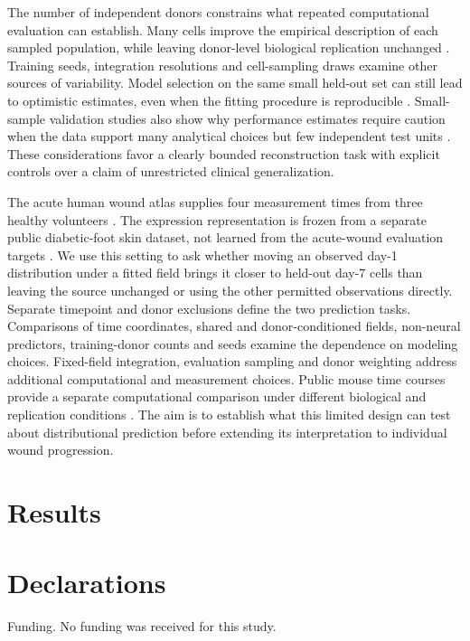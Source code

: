 \documentclass[10pt,a4paper]{article}
\begin{document}
The number of independent donors constrains what repeated computational evaluation can establish. Many cells improve the empirical description of each sampled population, while leaving donor-level biological replication unchanged \citep{zimmerman2021}. Training seeds, integration resolutions and cell-sampling draws examine other sources of variability. Model selection on the same small held-out set can still lead to optimistic estimates, even when the fitting procedure is reproducible \citep{varma2006,cawley2010}. Small-sample validation studies also show why performance estimates require caution when the data support many analytical choices but few independent test units \citep{vabalas2019}. These considerations favor a clearly bounded reconstruction task with explicit controls over a claim of unrestricted clinical generalization.

The acute human wound atlas supplies four measurement times from three healthy volunteers \citep{liu2025_wound,geo_gse241132}. The expression representation is frozen from a separate public diabetic-foot skin dataset, not learned from the acute-wound evaluation targets \citep{theocharidis2022}. We use this setting to ask whether moving an observed day-1 distribution under a fitted field brings it closer to held-out day-7 cells than leaving the source unchanged or using the other permitted observations directly. Separate timepoint and donor exclusions define the two prediction tasks. Comparisons of time coordinates, shared and donor-conditioned fields, non-neural predictors, training-donor counts and seeds examine the dependence on modeling choices. Fixed-field integration, evaluation sampling and donor weighting address additional computational and measurement choices. Public mouse time courses provide a separate computational comparison under different biological and replication conditions \citep{geo_gse326622}. The aim is to establish what this limited design can test about distributional prediction before extending its interpretation to individual wound progression.



\section{Results}



\section*{Declarations}
Funding. No funding was received for this study.
\end{document}
